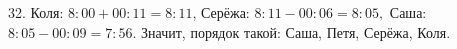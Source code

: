 32. Коля: $8:00+00:11=8:11$, Серёжа: $8:11-00:06=8:05,$ Саша: $8:05-00:09=7:56.$ Значит, порядок такой: Саша, Петя, Серёжа, Коля.\\
